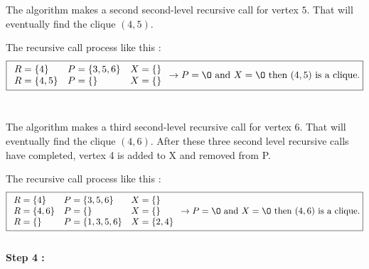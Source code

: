 \begin{minipage}{0.6\textwidth}
    The algorithm makes a second second-level recursive call for vertex $5$. That will eventually find the clique $(4,5)$.
\end{minipage}
The recursive call process like this  :
$$ \boxed{
        \begin{array}{lll}
            R = \{4\}   & P = \{3,5,6\} & X = \{\} \\
            R = \{4,5\} & P = \{\}      & X = \{\} \\
        \end{array}
        \rightarrow P = \O \text{ and } X = \O \text{ then } (4,5) \text{ is a clique.}
    }$$
\\
\begin{minipage}{0.4\textwidth}
\end{minipage}
\begin{minipage}{0.6\textwidth}
    The algorithm makes a third second-level recursive call for vertex $6$. That will eventually find the clique $(4, 6)$. After these three second level recursive calls have completed, vertex 4 is added to X and removed from P.
\end{minipage}
The recursive call process like this  :
$$ \boxed{
        \begin{array}{lll}
            R = \{4\}   & P = \{3,5,6\}   & X = \{\}    \\
            R = \{4,6\} & P = \{\}        & X = \{\}    \\
            R = \{\}    & P = \{1,3,5,6\} & X = \{2,4\} \\
        \end{array}
        \rightarrow P = \O \text{ and } X = \O \text{ then } (4,6) \text{ is a clique.}
    }$$
\\
\hspace*{1cm}  \textbf{Step 4 :}
\\
\begin{minipage}{0.4\textwidth}
\end{minipage}
